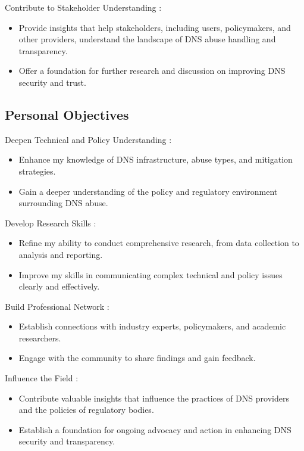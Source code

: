 Contribute to Stakeholder Understanding : 

\begin{itemize}
  \item Provide insights that help stakeholders, including users, policymakers, and other providers, understand the landscape of DNS abuse handling and transparency.
  \item Offer a foundation for further research and discussion on improving DNS security and trust.
\end{itemize}

\subsection {Personal Objectives}

Deepen Technical and Policy Understanding :

\begin{itemize}
  \item Enhance my knowledge of DNS infrastructure, abuse types, and mitigation strategies.
  \item Gain a deeper understanding of the policy and regulatory environment surrounding DNS abuse.
\end{itemize}

Develop Research Skills :

\begin{itemize}
  \item Refine my ability to conduct comprehensive research, from data collection to analysis and reporting.
  \item Improve my skills in communicating complex technical and policy issues clearly and effectively.
\end{itemize}

Build Professional Network : 

\begin{itemize}
  \item Establish connections with industry experts, policymakers, and academic researchers.
  \item Engage with the community to share findings and gain feedback.
\end{itemize}

Influence the Field : 

\begin{itemize}
  \item Contribute valuable insights that influence the practices of DNS providers and the policies of regulatory bodies.
  \item Establish a foundation for ongoing advocacy and action in enhancing DNS security and transparency.
\end{itemize}

